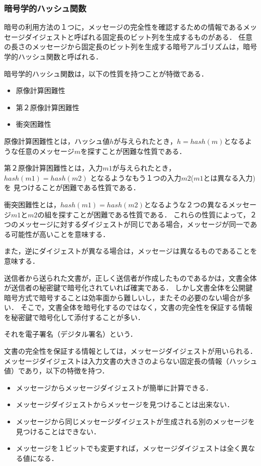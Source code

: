 \documentclass[a4paper,12pt]{jsarticle}
\begin{document}
      \subsubsection{暗号学的ハッシュ関数} %

暗号の利用方法の１つに，メッセージの完全性を確認するための情報であるメッセージダイジェストと呼ばれる固定長のビット列を生成するものがある．
任意の長さのメッセージから固定長のビット列を生成する暗号アルゴリズムは，暗号学的ハッシュ関数と呼ばれる．

暗号学的ハッシュ関数は，以下の性質を持つことが特徴である．
\begin{itemize}
  \item 原像計算困難性
  \item 第２原像計算困難性
  \item 衝突困難性
\end{itemize}

原像計算困難性とは，ハッシュ値$h$が与えられたとき，$ h = hash(m)$となるような任意のメッセージ$m$を探すことが困難な性質である．

第２原像計算困難性とは，入力$m1$が与えられたとき，$ hash(m1) = hash(m2)$ となるようなもう１つの入力$m2$($m1$とは異なる入力)を
見つけることが困難である性質である．

衝突困難性とは，$hash(m1)= hash(m2)$となるような２つの異なるメッセージ$m1$と$m2$の組を探すことが困難である性質である．
これらの性質によって，２つのメッセージに対するダイジェストが同じである場合，メッセージが同一である可能性が高いことを意味する．

また，逆にダイジェストが異なる場合は，メッセージは異なるものであることを意味する．


送信者から送られた文書が，正しく送信者が作成したものであるかは，文書全体が送信者の秘密鍵で暗号化されていれば確実である．
しかし文書全体を公開鍵暗号方式で暗号することは効率面から難しいし，またその必要のない場合が多い．
そこで，文書全体を暗号化するのではなく，文書の完全性を保証する情報を秘密鍵で暗号化して添付することが多い．

それを電子署名（デジタル署名）という．

文書の完全性を保証する情報としては，メッセージダイジェストが用いられる．
メッセージダイジェストは入力文書の大きさのよらない固定長の情報（ハッシュ値）であり，以下の特徴を持つ．

\begin{itemize}
  \item メッセージからメッセージダイジェストが簡単に計算できる．
  \item メッセージダイジェストからメッセージを見つけることは出来ない．
  \item メッセージから同じメッセージダイジェストが生成される別のメッセージを見つけることはできない．
  \item メッセージを１ビットでも変更すれば，メッセージダイジェストは全く異なる値になる．
\end{itemize}
\end{document}

